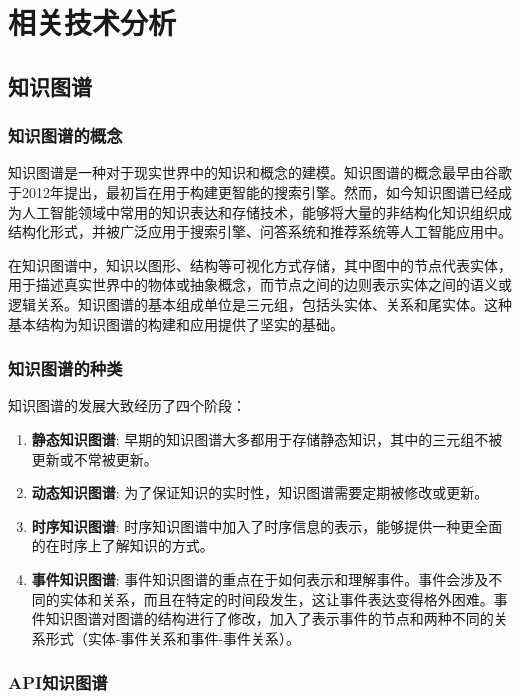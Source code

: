 
\chapter{相关技术分析}

\section{知识图谱}

\subsection{知识图谱的概念}
知识图谱是一种对于现实世界中的知识和概念的建模。知识图谱的概念最早由谷歌于2012年提出，最初旨在用于构建更智能的搜索引擎。然而，如今知识图谱已经成为人工智能领域中常用的知识表达和存储技术，能够将大量的非结构化知识组织成结构化形式，并被广泛应用于搜索引擎、问答系统和推荐系统等人工智能应用中。

在知识图谱中，知识以图形、结构等可视化方式存储，其中图中的节点代表实体，用于描述真实世界中的物体或抽象概念，而节点之间的边则表示实体之间的语义或逻辑关系。知识图谱的基本组成单位是三元组，包括头实体、关系和尾实体。这种基本结构为知识图谱的构建和应用提供了坚实的基础。

\subsection{知识图谱的种类}
知识图谱的发展大致经历了四个阶段\cite{Jiang2023}：

\begin{enumerate}
  \item \textbf{静态知识图谱}: 早期的知识图谱大多都用于存储静态知识，其中的三元组不被更新或不常被更新。
  \item \textbf{动态知识图谱}: 为了保证知识的实时性，知识图谱需要定期被修改或更新。
  \item \textbf{时序知识图谱}: 时序知识图谱中加入了时序信息的表示，能够提供一种更全面的在时序上了解知识的方式。
  \item \textbf{事件知识图谱}: 事件知识图谱的重点在于如何表示和理解事件。事件会涉及不同的实体和关系，而且在特定的时间段发生，这让事件表达变得格外困难。事件知识图谱对图谱的结构进行了修改，加入了表示事件的节点和两种不同的关系形式（实体-事件关系和事件-事件关系）。
\end{enumerate}

\subsection{API知识图谱}

